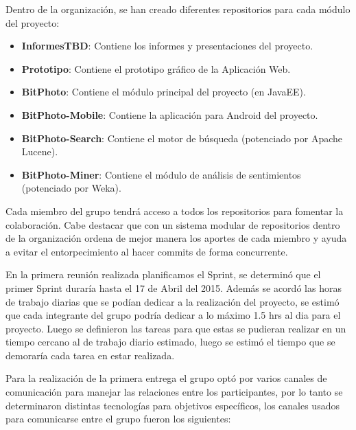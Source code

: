 \documentclass{memoria}
\begin{document}
Dentro de la organización, se han creado diferentes repositorios para cada módulo del proyecto:

\begin{itemize}
	\item \textbf{InformesTBD}: Contiene los informes y presentaciones del proyecto. 
	\item \textbf{Prototipo}: Contiene el prototipo gráfico de la Aplicación Web.
	\item \textbf{BitPhoto}: Contiene el módulo principal del proyecto (en JavaEE).
	\item \textbf{BitPhoto-Mobile}: Contiene la aplicación para Android del proyecto.
	\item \textbf{BitPhoto-Search}: Contiene el motor de búsqueda (potenciado por Apache Lucene).
	\item \textbf{BitPhoto-Miner}: Contiene el módulo de análisis de sentimientos (potenciado por Weka).
\end{itemize}

Cada miembro del grupo tendrá acceso a todos los repositorios para fomentar la colaboración. Cabe destacar que con un sistema modular de repositorios dentro de la organización ordena de mejor manera los aportes de cada miembro y ayuda a evitar el entorpecimiento al hacer commits de forma concurrente.

\newpage


En la primera reunión realizada planificamos el Sprint, se determinó que el primer Sprint duraría hasta el 17 de Abril del 2015. Además se acordó las horas de trabajo diarias que se podían dedicar a la realización del proyecto, se estimó que cada integrante del grupo podría dedicar a lo máximo 1.5 hrs al dia para el proyecto. Luego se definieron las tareas para que estas se pudieran realizar en un tiempo cercano al de trabajo diario estimado, luego se estimó el tiempo que se demoraría cada tarea en estar realizada. 

Para la realización de la primera entrega el grupo optó por varios canales de comunicación para manejar las relaciones entre los participantes, por lo tanto se determinaron distintas tecnologías para objetivos específicos, los canales usados para comunicarse entre el grupo fueron los siguientes:
\end{document}
